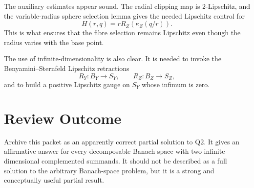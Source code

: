 \documentclass[11pt]{article}
\begin{document}
The auxiliary estimates appear sound. The radial clipping map is
\(2\)-Lipschitz, and the variable-radius sphere selection lemma gives the
needed Lipschitz control for
\[
  H(r,q)=rR_Z(\kappa_Z(q/r)).
\]
This is what ensures that the fibre selection remains Lipschitz even though
the radius varies with the base point.

The use of infinite-dimensionality is also clear. It is needed to invoke the
Benyamini--Sternfeld Lipschitz retractions
\[
  R_Y:B_Y\to S_Y,\qquad R_Z:B_Z\to S_Z,
\]
and to build a positive Lipschitz gauge on \(S_Y\) whose infimum is zero.

\section*{Review Outcome}

Archive this packet as an apparently correct partial solution to Q2. It gives
an affirmative answer for every decomposable Banach space with two
infinite-dimensional complemented summands. It should not be described as a
full solution to the arbitrary Banach-space problem, but it is a strong and
conceptually useful partial result.
\end{document}
